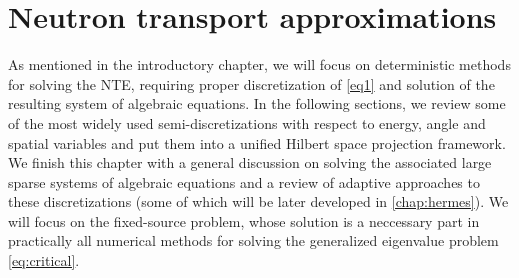 \ifpdf
	\graphicspath{{3/pic/PNG/}{3/pic/PDF/}{3/pic/}}
\else
	\graphicspath{{3/pic/EPS/}{3/pic/}}
\fi

\chapter{Neutron transport approximations}\label{chap:nte-methods}

As mentioned in the introductory chapter, we will focus on deterministic methods for solving the NTE, requiring proper
discretization of \eqref{eq1} and solution of the resulting system of algebraic equations.
In the following sections, we review some of the most widely used semi-discretizations with respect to energy, angle and
spatial variables and put them into a unified Hilbert space projection framework. We finish this chapter with a general
discussion on solving the associated large sparse systems of algebraic equations and a review of adaptive approaches to
these discretizations (some of which will be later developed in \cref{chap:hermes}). We will focus on the fixed-source
problem, whose solution is a neccessary part in practically all numerical methods for solving the generalized eigenvalue
problem \eqref{eq:critical}.

